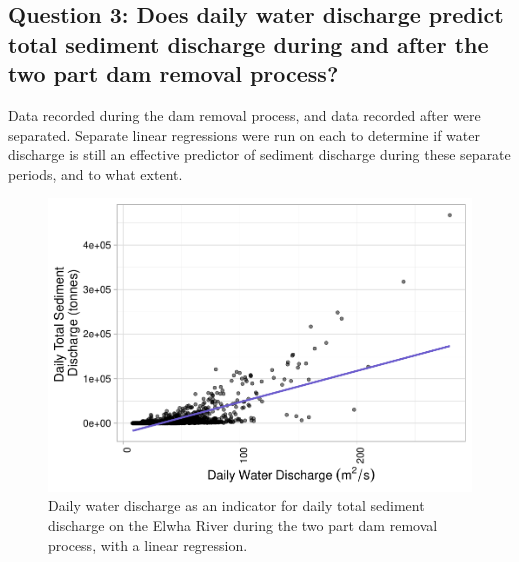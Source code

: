 \documentclass[12pt,]{article}
\begin{document}
\newpage

\hypertarget{question-3-does-daily-water-discharge-predict-total-sediment-discharge-during-and-after-the-two-part-dam-removal-process}{%
\subsection{Question 3: Does daily water discharge predict total
sediment discharge during and after the two part dam removal
process?}\label{question-3-does-daily-water-discharge-predict-total-sediment-discharge-during-and-after-the-two-part-dam-removal-process}}

Data recorded during the dam removal process, and data recorded after
were separated. Separate linear regressions were run on each to
determine if water discharge is still an effective predictor of sediment
discharge during these separate periods, and to what extent.

\begin{figure}
\centering
\includegraphics{Mason_ENV872_ProjectFinal_files/figure-latex/Linear During (Figure 13)-1.pdf}
\caption{Daily water discharge as an indicator for daily total sediment
discharge on the Elwha River during the two part dam removal process,
with a linear regression.}
\end{figure}
\end{document}
